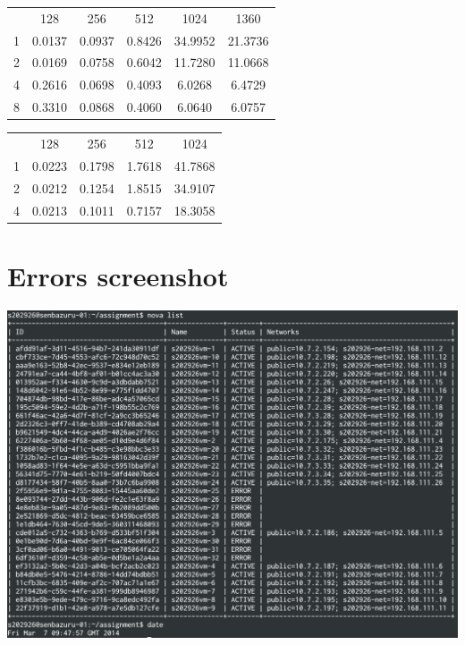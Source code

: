 \documentclass[a4paper,11pt]{article}
\begin{document}
\begin{center}
\begin{tabular}{c | c | c | c | c | c}
   & 128 & 256 & 512 & 1024 & 1360\\
1 & 0.0137 & 0.0937 & 0.8426 & 34.9952 & 21.3736 \\
2 & 0.0169 & 0.0758 & 0.6042 & 11.7280 & 11.0668 \\
4 & 0.2616 & 0.0698 & 0.4093 & 6.0268 & 6.4729 \\
8 & 0.3310 & 0.0868 & 0.4060 & 6.0640 & 6.0757
\end{tabular}
\vspace{1em}
\end{center}

\begin{center}
\begin{tabular}{c | c | c | c | c}
   & 128 & 256 & 512 & 1024 \\
1 & 0.0223 & 0.1798 & 1.7618 & 41.7868 \\
2 & 0.0212 & 0.1254 & 1.8515 & 34.9107 \\ 
4 & 0.0213 & 0.1011 & 0.7157 & 18.3058 \\
\end{tabular}
\vspace{1em}
\end{center}

\section{Errors screenshot}
\label{figure:errors}

\includegraphics[width=\textwidth]{./errors.png}
\end{document}
